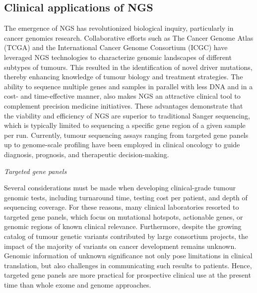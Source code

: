 \subsection{Clinical applications of NGS}

The emergence of NGS has revolutionized biological inquiry, particularly in cancer genomics research. Collaborative efforts such as The Cancer Genome Atlas (TCGA) and the International Cancer Genome Consortium (ICGC) have leveraged NGS technologies to characterize genomic landscapes of different subtypes of tumours. This resulted in the identification of novel driver mutations, thereby enhancing knowledge of tumour biology and treatment strategies. The ability to sequence multiple genes and samples in parallel with less DNA and in a cost- and time-effective manner, also makes NGS an attractive clinical tool to complement precision medicine initiatives. These advantages demonstrate that the viability and efficiency of NGS are superior to traditional Sanger sequencing, which is typically limited to sequencing a specific gene region of a given sample per run. Currently, tumour sequencing assays ranging from targeted gene panels up to genome-scale profiling have been employed in clinical oncology to guide diagnosis, prognosis, and therapeutic decision-making.

\vspace{5mm}
\noindent\textit{Targeted gene panels}

Several considerations must be made when developing clinical-grade tumour genomic tests, including turnaround time, testing cost per patient, and depth of sequencing coverage. For these reasons, many clinical laboratories resorted to targeted gene panels, which focus on mutational hotspots, actionable genes, or genomic regions of known clinical relevance. Furthermore, despite the growing catalog of tumour genetic variants contributed by large consortium projects, the impact of the majority of variants on cancer development remains unknown. Genomic information of unknown significance not only pose limitations in clinical translation, but also challenges in communicating such results to patients. Hence, targeted gene panels are more practical for prospective clinical use at the present time than whole exome and genome approaches.


